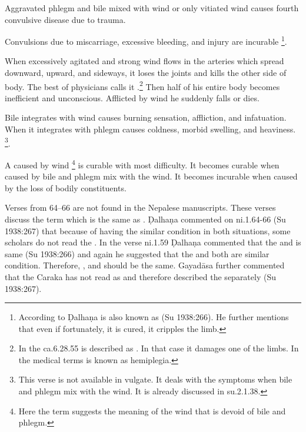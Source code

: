 \begin{translation}
{\item[58]

	Aggravated phlegm and bile mixed with wind or only vitiated wind causes
	fourth convulsive disease due to trauma.

\item[59]

	Convulsions due to miscarriage, excessive bleeding, and injury are
	incurable \footnote{According to Ḍalhaṇa  is
	also known as  (Su 1938:266). He further mentions that even
	if fortunately, it is cured, it cripples the limb.}.

\item[60--62]

	When excessively agitated and strong wind flows in the arteries which
	spread downward, upward, and sideways, it loses the joints and kills the
	other side of body. The best of physicians calls it
	.\footnote{In the ca.6.28.55 
	is described as . In that case it damages one
	of the limbs.  In the medical terms  is known
	as hemiplegia.} Then half of his entire body becomes inefficient and
	unconscious. Afflicted by wind he suddenly falls or dies.

\item[62.1]

	Bile integrates with wind causes burning sensation, affliction, and
	infatuation. When it integrates with phlegm causes coldness, morbid
	swelling, and heaviness. \footnote{This verse is not available in
	vulgate. It deals with the symptoms when bile and phlegm mix with the
	wind. It is already discussed in su.2.1.38.}. 

\item[63]

	A  caused by wind \footnote{Here the term
	 suggests the meaning of the wind that is devoid of bile and
	phlegm.} is curable with most difficulty. It becomes curable when caused
	by bile and phlegm mix with the wind. It becomes incurable when caused
	by the loss of bodily constituents.

\item[64--66]

	Verses from 64--66 are not found in the Nepalese manuscripts.  These
	verses discuss the term  which
	is the same as . Ḍalhaṇa commented on ni.1.64-66 (Su
	1938:267) that because of having the similar condition in both
	situations, some scholars do not read the . In the verse
	ni.1.59 Ḍalhaṇa commented that the  and  is same
	(Su 1938:266) and again he suggested that the  and
	 both are similar condition. Therefore, ,
	 and  should be the same. Gayadāsa further
	commented that the Caraka has not read  as  and
	therefore described the  separately (Su 1938:267).

}
\end{translation}
